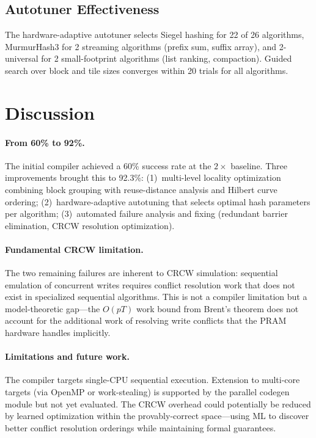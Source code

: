 \documentclass[11pt]{article}
\begin{document}
\subsection{Autotuner Effectiveness}

The hardware-adaptive autotuner selects Siegel hashing for 22 of 26
algorithms, MurmurHash3 for 2 streaming algorithms (prefix sum, suffix
array), and 2-universal for 2 small-footprint algorithms (list ranking,
compaction).  Guided search over block and tile sizes converges within
20 trials for all algorithms.


\section{Discussion}
\label{sec:discussion}

\paragraph{From 60\% to 92\%.}
The initial compiler achieved a 60\% success rate at the $2\times$
baseline.  Three improvements brought this to 92.3\%:
(1)~multi-level locality optimization combining block grouping with
reuse-distance analysis and Hilbert curve ordering;
(2)~hardware-adaptive autotuning that selects optimal hash parameters
per algorithm;
(3)~automated failure analysis and fixing (redundant barrier elimination,
CRCW resolution optimization).

\paragraph{Fundamental CRCW limitation.}
The two remaining failures are inherent to CRCW simulation: sequential
emulation of concurrent writes requires conflict resolution work that
does not exist in specialized sequential algorithms.  This is not a
compiler limitation but a model-theoretic gap---the $O(pT)$ work bound
from Brent's theorem does not account for the additional work of
resolving write conflicts that the PRAM hardware handles implicitly.

\paragraph{Limitations and future work.}
The compiler targets single-CPU sequential execution.  Extension to
multi-core targets (via OpenMP or work-stealing) is supported by the
parallel codegen module but not yet evaluated.  The CRCW overhead could
potentially be reduced by learned optimization within the
provably-correct space---using ML to discover better conflict resolution
orderings while maintaining formal guarantees.
\end{document}

